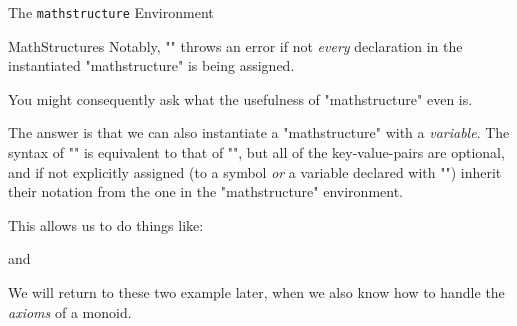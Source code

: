 \begin{sfragment}{The \texttt{mathstructure} Environment}
\begin{smodule}[ns=https://github.com/slatex/sTeX/doc]{MathStructures}
        Notably, \stexcode"\instantiate" throws an error if not \emph{every}
        declaration in the instantiated \stexcode"mathstructure" is being assigned.
        
        You might consequently ask what the usefulness of \stexcode"mathstructure"
        even is.

        \begin{function}{\varinstantiate}
            The answer is that we can also instantiate a 
            \stexcode"mathstructure" with a \emph{variable}.
            The syntax of \stexcode"\varianstantiate" is equivalent
            to that of \stexcode"\instantiate", but all of the key-value-pairs
            are optional, and if not explicitly assigned (to a symbol \emph{or}
            a variable declared with \stexcode"\vardef") inherit their notation
            from the one in the \stexcode"mathstructure" environment.
        \end{function}

        This allows us to do things like:


and


        We will return to these two example later, when we also know
        how to handle the \emph{axioms} of a monoid.
\end{smodule}
\end{sfragment}

